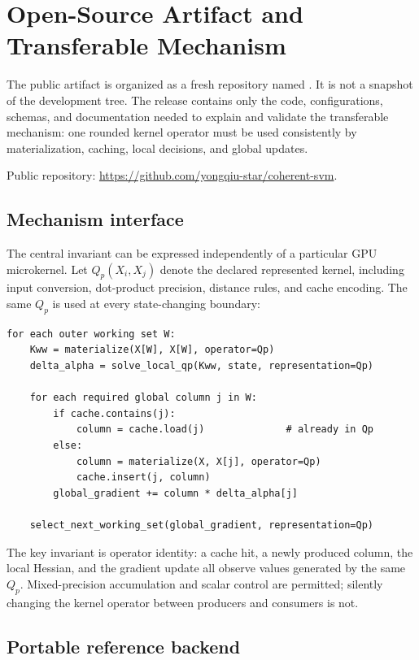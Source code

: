 \section{Open-Source Artifact and Transferable Mechanism}
\label{sec:artifact}

The public artifact is organized as a fresh repository named
. It is not a snapshot of the development tree. The
release contains only the code, configurations, schemas, and documentation
needed to explain and validate the transferable mechanism: one rounded kernel
operator must be used consistently by materialization, caching, local
decisions, and global updates.

\noindent Public repository:
\url{https://github.com/yongqiu-star/coherent-svm}.

\subsection{Mechanism interface}

The central invariant can be expressed independently of a particular GPU
microkernel. Let $Q_p(X_i,X_j)$ denote the declared represented kernel,
including input conversion, dot-product precision, distance rules, and cache
encoding. The same $Q_p$ is used at every state-changing boundary:

\begin{lstlisting}[style=codeblock]
for each outer working set W:
    Kww = materialize(X[W], X[W], operator=Qp)
    delta_alpha = solve_local_qp(Kww, state, representation=Qp)

    for each required global column j in W:
        if cache.contains(j):
            column = cache.load(j)              # already in Qp
        else:
            column = materialize(X, X[j], operator=Qp)
            cache.insert(j, column)
        global_gradient += column * delta_alpha[j]

    select_next_working_set(global_gradient, representation=Qp)
\end{lstlisting}

The key invariant is operator identity: a cache hit, a newly produced column,
the local Hessian, and the gradient update all observe values generated by
the same $Q_p$. Mixed-precision accumulation and scalar control are permitted;
silently changing the kernel operator between producers and consumers is not.

\subsection{Portable reference backend}

